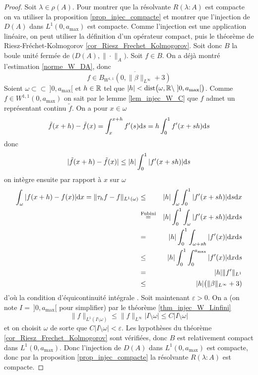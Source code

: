 \begin{proof}
    Soit $\lambda \in \rho(A)$. Pour montrer que la résolvante $R(\lambda : A)$ est compacte on va utiliser la proposition \ref{prop_injec_compacte} et montrer que l'injection de $D(A)$ dans $L^1(0,a_{\max})$ est compacte. Comme l'injection est une application linéaire, on peut utiliser la définition d'un opérateur compact, puis le théorème de Riesz-Fréchet-Kolmogorov \ref{cor_Riesz_Frechet_Kolmogorov}. Soit donc $B$ la boule unité fermée de $\big(D(A),\|\cdot\|_{A}\big)$. Soit $f \in B$. On a déjà montré l'estimation \eqref{norme_W_DA}, donc 
    \begin{equation*}
        f \in \overline{B_{W^{1,1}}(0,\|\beta\|_{L^\infty}+3)}
    \end{equation*}
    Soient $\omega \subset \subset \ ]0,a_{\max}[$ et $h \in \mathbb{R}$ tel que $|h| < \mathrm{dist}\big(\omega, \bbR \setminus \ ]0,a_{\max}[\big)$. Comme $f \in W^{1,1}(0,a_{\max})$ on sait par le lemme \ref{lem_injec_W_C} que $f$ admet un représentant continu $\tilde{f}$. On a pour $x \in \omega$
    \begin{equation*}
        \tilde{f}(x+h)-\tilde{f}(x) = \int_x^{x+h}f'(s)\mathrm{d} s = h \int_0^1f'(x+sh)\mathrm{d} s
    \end{equation*}
    donc 
    \begin{equation*}
        |\tilde{f}(x+h)-\tilde{f}(x)| \leq |h| \int_0^1|f'(x+sh)|\mathrm{d} s 
    \end{equation*}
    on intègre ensuite par rapport à $x$ sur $\omega$
    \begin{eqnarray*}
        \int_{\omega}|f(x+h)-f(x)|\mathrm{d} x = \|\tau_hf-f\|_{L^1(\omega)} &\leq& |h| \int_{\omega}\int_0^1 |f'(x+sh)|\mathrm{d} s\mathrm{d} x \\
        &\overset{\text{Fubini}}{=}& |h| \int_0^1\int_{\omega}|f'(x+sh)|\mathrm{d} x\mathrm{d} s \\
        &=& |h| \int_0^1 \int_{\omega +sh}|f'(x)|\mathrm{d} x \mathrm{d} s \\
        &\leq& |h|\int_0^1 \int_0^{a_{\max}} |f'(x)|\mathrm{d} x\mathrm{d} s \\
        &=& |h| \|f'\|_{L^1} \\
        &\leq& |h|\big(\|\beta\|_{L^\infty}+3)
    \end{eqnarray*}
    d'où la condition \og d'équicontinuité intégrale \fg{}. Soit maintenant $\varepsilon >0$. On a (on note $I = \ ]0,a_{\max}[$ pour simplifier) par le théorème \ref{thm_injec_W_Linfini}
    \begin{equation*}
        \|f\|_{L^1(I \setminus \omega)} \leq \|f\|_{L^\infty}|I \setminus \omega| \leq C|I \setminus \omega|
    \end{equation*}
    et on choisit $\omega$ de sorte que $C|I\setminus \omega| < \varepsilon$. Les hypothèses du théorème \ref{cor_Riesz_Frechet_Kolmogorov} sont vérifiées, donc $B$ est relativement compact dans $L^1(0,a_{\max})$. Donc l'injection de $D(A)$ dans $L^1(0,a_{\max})$ est compacte, donc par la proposition \ref{prop_injec_compacte} la résolvante $R(\lambda : A)$ est compacte.
\end{proof}


